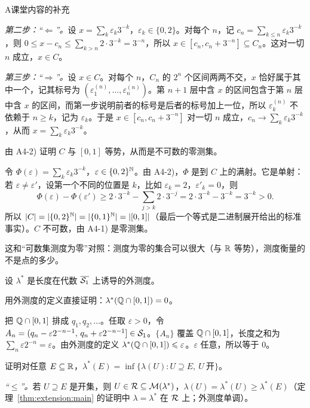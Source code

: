 \begin{exercises}{A}{课堂内容的补充}
\begin{questions}
\begin{solution}
\emph{第二步：“$\Leftarrow$”。}设 $x=\sum_k\varepsilon_k3^{-k}$，$\varepsilon_k\in\{0,2\}$。对每个 $n$，记 $c_n=\sum_{k\leqslant n}\varepsilon_k3^{-k}$，则 $0\leqslant x-c_n\leqslant\sum_{k>n}2\cdot3^{-k}=3^{-n}$，所以 $x\in[c_n,c_n+3^{-n}]\subseteq C_n$。这对一切 $n$ 成立，$x\in C$。

\emph{第三步：“$\Rightarrow$”。}设 $x\in C$。对每个 $n$，$C_n$ 的 $2^n$ 个区间两两不交，$x$ 恰好属于其中一个，记其标号为 $(\varepsilon_1^{(n)},\dots,\varepsilon_n^{(n)})$。第 $n+1$ 层中含 $x$ 的区间包含于第 $n$ 层中含 $x$ 的区间，而第一步说明前者的标号是后者的标号加上一位，所以 $\varepsilon_k^{(n)}$ 不依赖于 $n\geqslant k$，记为 $\varepsilon_k$。于是 $x\in[c_n,c_n+3^{-n}]$ 对一切 $n$ 成立，$c_n\to\sum_k\varepsilon_k3^{-k}$，从而 $x=\sum_k\varepsilon_k3^{-k}$。
\end{solution}
\item 由 A4-2) 证明 $C$ 与 $[0,1]$ 等势，从而是不可数的零测集。
\begin{solution}
令 $\Phi(\varepsilon)=\sum_k\varepsilon_k3^{-k}$，$\varepsilon\in\{0,2\}^{\mathbb{N}}$。由 A4-2)，$\Phi$ 是到 $C$ 上的满射。它是单射：若 $\varepsilon\neq\varepsilon'$，设第一个不同的位置是 $k$，比如 $\varepsilon_k=2$，$\varepsilon'_k=0$，则
\[
\Phi(\varepsilon)-\Phi(\varepsilon')\geqslant2\cdot3^{-k}-\sum_{j>k}2\cdot3^{-j}=2\cdot3^{-k}-3^{-k}=3^{-k}>0.
\]
所以 $\lvert C\rvert=\lvert \{0,2\}^{\mathbb{N}}\rvert=\lvert \{0,1\}^{\mathbb{N}}\rvert=\lvert [0,1]\rvert$（最后一个等式是二进制展开给出的标准事实）。$C$ 不可数，由 A4-1) 是零测集。

这和“可数集测度为零”对照：测度为零的集合可以很大（与 $\mathbb{R}$ 等势），测度衡量的不是点的多少。
\end{solution}
\end{questions}

\item\label{ex:extension:A5} 设 $\lambda^*$ 是长度在代数 $\overline{\mathcal{S}_1}$ 上诱导的外测度。
\begin{questions}
\item 用外测度的定义直接证明：$\lambda^*(\mathbb{Q}\cap[0,1])=0$。
\begin{solution}
把 $\mathbb{Q}\cap[0,1]$ 排成 $q_1,q_2,\dots$。任取 $\varepsilon>0$，令 $A_n=(q_n-\varepsilon2^{-n-1},\,q_n+\varepsilon2^{-n-1}]\in\mathcal{S}_1$。$\{A_n\}$ 覆盖 $\mathbb{Q}\cap[0,1]$，长度之和为 $\sum_n\varepsilon2^{-n}=\varepsilon$。由外测度的定义 $\lambda^*(\mathbb{Q}\cap[0,1])\leqslant\varepsilon$。$\varepsilon$ 任意，所以等于 $0$。
\end{solution}
\item 证明对任意 $E\subseteq\mathbb{R}$，$\lambda^*(E)=\inf\{\lambda(U): U\supseteq E,\ U\ \text{开}\}$。
\begin{solution}
\emph{“$\leqslant$”。}若 $U\supseteq E$ 是开集，则 $U\in\mathcal{R}\subseteq\mathcal{M}(\lambda^*)$，$\lambda(U)=\lambda^*(U)\geqslant\lambda^*(E)$（定理~\ref{thm:extension:main} 的证明中 $\lambda=\lambda^*$ 在 $\mathcal{R}$ 上；外测度单调）。


\end{solution}
\end{questions}
\end{exercises}
